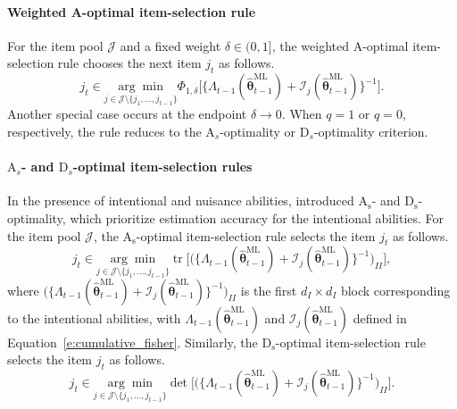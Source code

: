\documentclass[12pt]{article}
\newcommand{\bftheta}{\boldsymbol{\theta}}
\begin{document}
\paragraph{Weighted A-optimal item-selection rule} For the item pool $\mathcal{J}$ and a fixed weight $\delta \in (0,1]$, the weighted A-optimal item-selection rule chooses the next item $j_t$ as follows.
\begin{equation} \label{e:wa-optimal}
  j_t \in \underset{j \in \mathcal{J} \setminus \{j_1, \ldots, j_{t-1}\}}{\arg \min} \Phi_{1, \delta} \Big[ \Big\{ \Lambda_{t-1}( \hat{\bftheta}_{t-1}^{\mathrm{ML}}) + \mathcal{I}_j(\hat{\bftheta}_{t-1}^{\mathrm{ML}}) \Big\}^{-1} \Big].
\end{equation}
Another special case occurs at the endpoint $\delta \to 0$. When $q=1$ or $q=0$, respectively, the rule reduces to the $\mathrm{A}_s$-optimality or $\mathrm{D}_s$-optimality criterion.
\paragraph{$\mathrm{A}_s$- and $\mathrm{D}_s$-optimal item-selection rules} 
In the presence of intentional and nuisance abilities,  introduced $\operatorname{A_s}$- and $\operatorname{D_s}$-optimality, which prioritize estimation accuracy for the intentional abilities. For the item pool $\mathcal{J}$, the $\operatorname{A_s}$-optimal item-selection rule selects the item $j_t$ as follows.
\begin{equation} \label{e:as-optimal}
 j_t \in \underset{j \in \mathcal{J} \setminus \{j_1, \ldots, j_{t-1}\}}{\arg \min} \operatorname{tr} \Big[ \Big( \{ \Lambda_{t-1}( \hat{\bftheta}_{t-1}^{\mathrm{ML}} ) + \mathcal{I}_j(\hat{\bftheta}_{t-1}^{\mathrm{ML}})\}^{-1} \Big)_{II} \Big],
\end{equation}
where $\Big( \{ \Lambda_{t-1}( \hat{\bftheta}_{t-1}^{\mathrm{ML}} ) + \mathcal{I}_j(\hat{\bftheta}_{t-1}^{\mathrm{ML}}) \}^{-1} \Big)_{II}$ is the first $d_I \times d_I$ block corresponding to the intentional abilities, with $\Lambda_{t-1}(\hat{\bftheta}_{t-1}^{\mathrm{ML}})$ and $\mathcal{I}_j(\hat{\bftheta}_{t-1}^{\mathrm{ML}})$ defined in Equation~\eqref{e:cumulative_fisher}. Similarly, the $\operatorname{D_s}$-optimal item-selection rule selects the item $j_t$ as follows.
\begin{equation} \label{e:ds-optimal}
 j_t \in \underset{j \in \mathcal{J} \setminus \{j_1, \ldots, j_{t-1}\}}{\arg \min} \operatorname{det} \Big[ \Big( \{ \Lambda_{t-1}( \hat{\bftheta}_{t-1}^{\mathrm{ML}} ) + \mathcal{I}_j(\hat{\bftheta}_{t-1}^{\mathrm{ML}})\}^{-1} \Big)_{II} \Big].
\end{equation}
\end{document}
